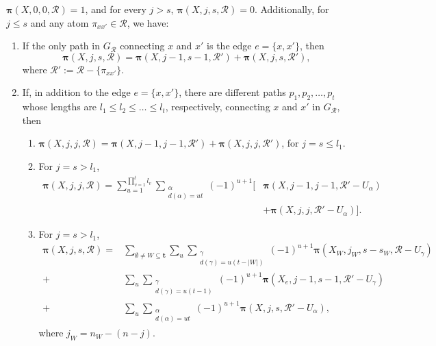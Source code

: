 \documentclass[10pt,a4paper]{amsart}
\begin{document}
	\begin{Theorem}  $\bm{\pi}(X, 0,0,\mathcal{R})=1$, and for every $j>s$, $\bm{\pi}(X, j,s,\mathcal{R})=0$. Additionally, for $j\leq s$ and any atom $\pi_{xx'}\in\mathcal{R}$, we have:
		
		\begin{enumerate}
			\item If the only path in $G_{\mathcal{R}}$ connecting $x$ and $x'$ is the edge $e=\{x,x'\}$, then
			\begin{equation}
			 \bm{\pi}(X,j,s,\mathcal{R})=\bm{\pi}(X,j-1,s-1,\mathcal{R}')+ \bm{\pi}(X,j,s,\mathcal{R}'), 
			\end{equation}
			where $\mathcal{R}':=\mathcal{R}-\{\pi_{xx'}\}$.
			\item If, in addition to the edge $e=\{x,x'\}$, there are  different paths $p_1,p_2,\ldots,p_t$ whose lengths are $l_1\leq l_2\leq\ldots\leq l_t$, respectively, connecting $x$ and $x'$ in $G_{\mathcal{R}}$, then
			\begin{enumerate}
				\item $\bm{\pi}(X,j,j,\mathcal{R})=\bm{\pi}(X,j-1,j-1,\mathcal{R}')+ \bm{\pi}(X,j,j,\mathcal{R}')$, for $j=s\leq l_1$.\\
				\item For $j= s> l_1$,
				\begin{align*}
				\bm{\pi}(X, j, j, \mathcal{R}) = \sum_{u=1}^{\prod_{v=1}^t l_v} \sum_{\substack{\alpha \\ d(\alpha) = ut}} (-1)^{u+1} \Big[ 
				& \bm{\pi}(X, j-1, j-1, \mathcal{R}' - U_{\alpha}) \\
				& + \bm{\pi}(X, j, j, \mathcal{R}' - U_{\alpha}) 
				\Big].
				\end{align*} 
				
				\item For $j= s> l_1$, \begin{align*}
				\bm{\pi}(X, j, s, \mathcal{R}) = 
				& \sum_{\emptyset \neq W \subseteq \mathbf{t}} \sum_u \sum_{\substack{\gamma \\ d(\gamma) = u(t - |W|)}} (-1)^{u+1} 
				\bm{\pi}(X_W, j_W, s - s_W, \mathcal{R} - U_{\gamma}) \\
				+\, & \sum_u \sum_{\substack{\gamma \\ d(\gamma) = u(t - 1)}} (-1)^{u+1} 
				\bm{\pi}(X_e, j - 1, s - 1, \mathcal{R}' - U_{\gamma}) \\
				+\, & \sum_u \sum_{\substack{\alpha \\ d(\alpha) = ut}} (-1)^{u+1} 
				\bm{\pi}(X, j, s, \mathcal{R}' - U_{\alpha}),
				\end{align*}
				where $j_W=n_W-(n-j)$.
					\end{enumerate}
		\end{enumerate}
		
	\end{Theorem}
\end{document}
